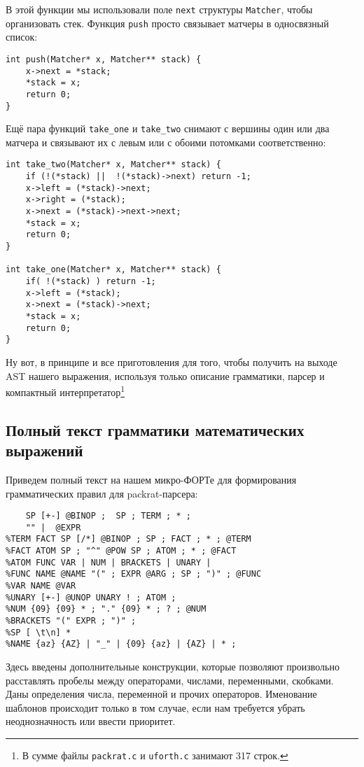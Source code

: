 \documentclass[10pt]{report}
\begin{document}
В этой функции  мы использовали поле {\tt next} структуры {\tt Matcher}, чтобы организовать стек.
Функция {\tt push} просто связывает матчеры в односвязный список:
\begin{lstlisting}[firstnumber=56, caption=packrat.c -- push на стек]
int push(Matcher* x, Matcher** stack) {
	x->next = *stack;
	*stack = x;
	return 0;
}
\end{lstlisting} 
Ещё пара функций  {\tt take\_one}  и {\tt take\_two} снимают с вершины один или два матчера и связывают их с левым или с обоими потомками соответственно:
\begin{lstlisting}[firstnumber=40, caption=packrat.c -- снятие и связывание]
int take_two(Matcher* x, Matcher** stack) {
	if (!(*stack) ||  !(*stack)->next) return -1;
	x->left = (*stack)->next;
	x->right = (*stack);
	x->next = (*stack)->next->next;
	*stack = x;
	return 0;
}	

int take_one(Matcher* x, Matcher** stack) {
	if( !(*stack) ) return -1;
	x->left = (*stack);
	x->next = (*stack)->next;
	*stack = x;
	return 0;
}
\end{lstlisting}
Ну вот, в принципе и все приготовления для того, чтобы получить на выходе AST нашего выражения, используя только описание грамматики, парсер и компактный интерпретатор\footnote{В сумме файлы {\tt packrat.c} и {\tt uforth.c} занимают 317 строк.}
\subsection{Полный текст грамматики математических выражений}
Приведем полный текст на нашем микро-ФОРТе для формирования грамматических правил для packrat-парсера:
\begin{lstlisting}[language=ppf, caption=expr.ppf -- Грамматика в виде $\mu Forth$-записи, label=lst:final-grammar]
%EXPR SP TERM ; 
	SP [+-] @BINOP ;  SP ; TERM ; * ; 
	"" |  @EXPR
%TERM FACT SP [/*] @BINOP ; SP ; FACT ; * ; @TERM
%FACT ATOM SP ; "^" @POW SP ; ATOM ; * ; @FACT
%ATOM FUNC VAR | NUM | BRACKETS | UNARY |
%FUNC NAME @NAME "(" ; EXPR @ARG ; SP ; ")" ; @FUNC
%VAR NAME @VAR
%UNARY [+-] @UNOP UNARY ! ; ATOM ;
%NUM {09} {09} * ; "." {09} * ; ? ; @NUM
%BRACKETS "(" EXPR ; ")" ;
%SP [ \t\n] * 
%NAME {az} {AZ} | "_" | {09} {az} | {AZ} | * ;
\end{lstlisting}
Здесь  введены дополнительные конструкции, которые позволяют произвольно расставлять пробелы между операторами, числами, переменными, скобками.
Даны определения числа, переменной и прочих операторов.
Именование шаблонов происходит только в том случае, если нам требуется убрать неоднозначность или ввести приоритет.
\end{document}
